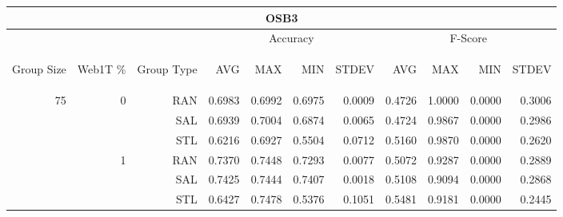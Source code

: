 \begin{center}
\begin{table}[htbp]
\begin{tabular}{ | r | r | r | r | r | r | r | r | r | r | r |}
\hline
\multicolumn{11}{|c|}{OSB3}\\
\hline
 & & & \multicolumn{4}{|c|}{Accuracy} & \multicolumn{4}{|c|}{F-Score}\\ \cline{4-11}
\begin{sideways}Group Size\end{sideways} & \begin{sideways}Web1T \%\end{sideways} & \begin{sideways}Group Type\end{sideways} & \begin{sideways}AVG\end{sideways} & \begin{sideways}MAX\end{sideways} & \begin{sideways}MIN\end{sideways} & \begin{sideways}STDEV\end{sideways} & \begin{sideways}AVG\end{sideways} & \begin{sideways}MAX\end{sideways} & \begin{sideways}MIN\end{sideways} & \begin{sideways}STDEV\end{sideways}\\
\hline
\multirow{18}{*}{75}
 & \multirow{3}{*}{0} & RAN & 0.6983 & 0.6992 & 0.6975 & 0.0009 & 0.4726 & 1.0000 & 0.0000 & 0.3006\\ \cline{3-11}
 &   & SAL & 0.6939 & 0.7004 & 0.6874 & 0.0065 & 0.4724 & 0.9867 & 0.0000 & 0.2986\\ \cline{3-11}
 &   & STL & 0.6216 & 0.6927 & 0.5504 & 0.0712 & 0.5160 & 0.9870 & 0.0000 & 0.2620\\ \cline{2-11}
 & \multirow{3}{*}{1} & RAN & 0.7370 & 0.7448 & 0.7293 & 0.0077 & 0.5072 & 0.9287 & 0.0000 & 0.2889\\ \cline{3-11}
 &   & SAL & 0.7425 & 0.7444 & 0.7407 & 0.0018 & 0.5108 & 0.9094 & 0.0000 & 0.2868\\ \cline{3-11}
 &   & STL & 0.6427 & 0.7478 & 0.5376 & 0.1051 & 0.5481 & 0.9181 & 0.0000 & 0.2445\\ \cline{2-11}

\end{tabular}
\end{table}
\end{center}
